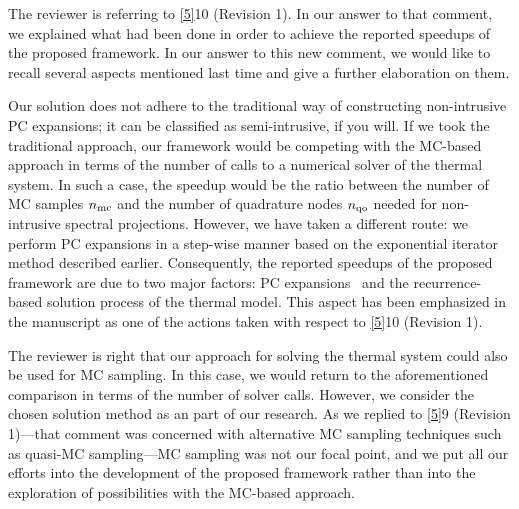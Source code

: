 \begin{authors}
The reviewer is referring to \cref{5}{10 (Revision 1)}.
In our answer to that comment, we explained what had been done in order to achieve the reported speedups of the proposed framework.
In our answer to this new comment, we would like to recall several aspects mentioned last time and give a further elaboration on them.

Our solution does not adhere to the traditional way of constructing non-intrusive PC expansions; it can be classified as semi-intrusive, if you will.
If we took the traditional approach, our framework would be competing with the MC-based approach in terms of the number of calls to a numerical solver of the thermal system.
In such a case, the speedup would be the ratio between the number of MC samples ${n_\text{mc}}$ and the number of quadrature nodes ${n_\text{qo}}$ needed for non-intrusive spectral projections.
However, we have taken a different route: we perform PC expansions in a step-wise manner based on the exponential iterator method described earlier.
Consequently, the reported speedups of the proposed framework are due to two major factors: PC expansions \perse\ and the recurrence-based solution process of the thermal model.
This aspect has been emphasized in the manuscript as one of the actions taken with respect to \cref{5}{10 (Revision 1)}.

The reviewer is right that our approach for solving the thermal system could also be used for MC sampling.
In this case, we would return to the aforementioned comparison in terms of the number of solver calls.
However, we consider the chosen solution method as an part of our research.
As we replied to \cref{5}{9 (Revision 1)}---that comment was concerned with alternative MC sampling techniques such as quasi-MC sampling---MC sampling was not our focal point, and we put all our efforts into the development of the proposed framework rather than into the exploration of possibilities with the MC-based approach.


\end{authors}

